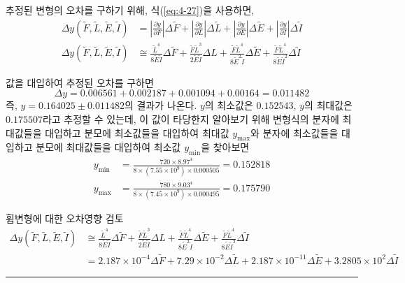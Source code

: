 추정된 변형의 오차를 구하기 위해, 식(\ref{eq:4-27})을 사용하면,
\begin{align*}
\Delta y(\tilde{F},\tilde{L},\tilde{E},\tilde{I}) &=\left|\frac{\partial y}{\partial F}\right| \Delta\tilde{F}+\left|\frac{\partial y}{\partial L}\right| \Delta\tilde{L}+\left|\frac{\partial y}{\partial E}\right| \Delta\tilde{E}+\left|\frac{\partial y}{\partial I}\right| \Delta\tilde{I}\\
\Delta y(\tilde{F},\tilde{L},\tilde{E},\tilde{I}) &\cong \frac{\tilde{L}^4}{8\tilde{E}\tilde{I}}\Delta\tilde{F} + \frac{\tilde{F}\tilde{L}^3}{2\tilde{E}\tilde{I}}\Delta{L} + \frac{\tilde{F}\tilde{L}^4}{8\tilde{E}^2\tilde{I}}\Delta\tilde{E} + \frac{\tilde{F}\tilde{L}^4}{8\tilde{E}\tilde{I}^2}\Delta\tilde{I}
\end{align*}

값을 대입하여 추정된 오차를 구하면
\begin{equation*}
\Delta y=0.006561+0.002187+0.001094+0.00164=0.011482
\end{equation*}
즉, $y = 0.164025 \pm 0.011482$의 결과가 나온다. $y$의 최소값은 $0.152543$, $y$의 최대값은 $0.175507$라고 추정할 수 있는데, 이 값이 타당한지 알아보기 위해 변형식의 분자에 최대값들을 대입하고 분모에 최소값들을 대입하여 최대값 $y_{\max}$와 분자에 최소값들을 대입하고 분모에 최대값들을 대입하여 최소값 $y_{\min}$을 찾아보면
\begin{align*}
y_{\min}&=\frac{720 \times 8.97^4}{8 \times (7.55 \times 10^9) \times 0.000505} = 0.152818\\
y_{\max}&=\frac{780 \times 9.03^4}{8 \times (7.45 \times 10^9) \times 0.000495} = 0.175790
\end{align*}

휨변형에 대한 오차영향 검토
\begin{align*}
\Delta y(\tilde{F},\tilde{L},\tilde{E},\tilde{I}) &\cong \frac{\tilde{L}^4}{8\tilde{E}\tilde{I}}\Delta\tilde{F} + \frac{\tilde{F}\tilde{L}^3}{2\tilde{E}\tilde{I}}\Delta{L} + \frac{\tilde{F}\tilde{L}^4}{8\tilde{E}^2\tilde{I}}\Delta\tilde{E} + \frac{\tilde{F}\tilde{L}^4}{8\tilde{E}\tilde{I}^2}\Delta\tilde{I}\\
&=2.187\times 10^{-4} \Delta\tilde{F} + 7.29\times 10^{-2} \Delta\tilde{L} + 2.187\times 10^{-11} \Delta\tilde{E} + 3.2805\times10^{2} \Delta\tilde{I}
\end{align*}
\rule{\textwidth}{0.1pt}

